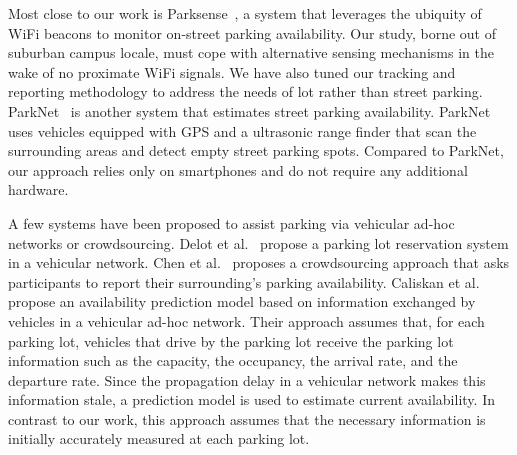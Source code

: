 Most close to our work is Parksense~\cite{Nawaz:2013:PSB}, a system that
leverages the ubiquity of WiFi
beacons to monitor on-street parking availability.  Our study, borne out of
suburban campus locale, must cope with alternative sensing mechanisms in the
wake of no proximate WiFi
signals.  We have also tuned our tracking and reporting methodology to address
the needs of lot rather than street parking.
ParkNet~\cite{Mathur:2010:PDS} is another system that
estimates street parking availability. ParkNet uses vehicles equipped with GPS
and a ultrasonic range finder that scan the surrounding areas and detect
empty street parking spots. Compared to ParkNet, our approach relies only on
smartphones and do not require any additional hardware.

A few systems have been proposed to assist parking via vehicular ad-hoc
networks or crowdsourcing. Delot et al.~\cite{Delot:2009:CRP} propose a parking
lot reservation system in a vehicular network. Chen et al.~\cite{Chen:2012:COS}
proposes a crowdsourcing approach that asks participants to report their
surrounding's parking availability. Caliskan et al.~\cite{4212497} propose an
availability prediction model based on information exchanged by vehicles in a
vehicular ad-hoc network. Their approach assumes that, for each parking lot,
vehicles that drive by the parking lot receive the parking lot information such
as the capacity, the occupancy, the arrival rate, and the departure rate. Since
the propagation delay in a vehicular network makes this information stale, a
prediction model is used to estimate current availability. In contrast to
our work, this approach assumes that the necessary information is initially
accurately measured at each parking lot.
